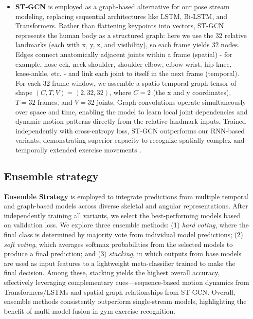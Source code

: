\documentclass[runningheads]{llncs}
\begin{document}
\begin{itemize}
\item \textbf{ST‐GCN} is employed as a graph‐based alternative for our pose stream modeling, replacing sequential architectures like LSTM, Bi‐LSTM, and Transformers. Rather than flattening keypoints into vectors, ST‐GCN represents the human body as a structured graph: here we use the 32 relative landmarks (each with x, y, z, and visibility), so each frame yields 32 nodes. Edges connect anatomically adjacent joints within a frame (spatial) - for example, nose-eck, neck-shoulder, shoulder-elbow, elbow-wrist, hip-knee, knee-ankle, etc. - and link each joint to itself in the next frame (temporal). For each 32‐frame window, we assemble a spatio‐temporal graph tensor of shape $(C, T, V) = (2, 32, 32)$, where $C=2$ (the x and y coordinates), $T=32$ frames, and $V=32$ joints. Graph convolutions operate simultaneously over space and time, enabling the model to learn local joint dependencies and dynamic motion patterns directly from the relative landmark inputs. Trained independently with cross-entropy loss, ST‐GCN outperforms our RNN‐based variants, demonstrating superior capacity to recognize spatially complex and temporally extended exercise movements \cite{yan2018stgcn}. 

\end{itemize}

\subsection{Ensemble strategy}


\textbf{Ensemble Strategy} is employed to integrate predictions from multiple temporal and graph-based models across diverse skeletal and angular representations. After independently training all variants, we select the best-performing models based on validation loss. We explore three ensemble methods: (1) \textit{hard voting}, where the final class is determined by majority vote from individual model predictions; (2) \textit{soft voting}, which averages softmax probabilities from the selected models to produce a final prediction; and (3) \textit{stacking}, in which outputs from base models are used as input features to a lightweight meta-classifier trained to make the final decision. Among these, stacking yields the highest overall accuracy, effectively leveraging complementary cues—sequence-based motion dynamics from Transformers/LSTMs and spatial graph relationships from ST-GCN. Overall, ensemble methods consistently outperform single-stream models, highlighting the benefit of multi-model fusion in gym exercise recognition.\cite{wolpert1992stacking}
\end{document}
